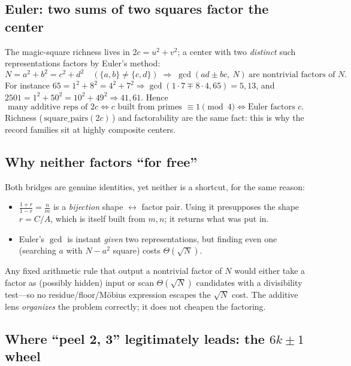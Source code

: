 \documentclass[11pt]{article}
\begin{document}
\subsection*{Euler: two sums of two squares factor the center}

The magic-square richness lives in $2c=u^2+v^2$; a center with two \emph{distinct}
such representations factors by Euler's method:
\[
N=a^2+b^2=c^2+d^2\quad(\{a,b\}\neq\{c,d\})
\;\Longrightarrow\;
\gcd(ad\pm bc,\ N)\ \text{are nontrivial factors of }N.
\]
For instance $65=1^2+8^2=4^2+7^2\Rightarrow\gcd(1\cdot7\mp8\cdot4,65)=5,13$, and
$2501=1^2+50^2=10^2+49^2\Rightarrow41,61$. Hence
\[
\text{many additive reps of }2c
\iff c\text{ built from primes }\equiv1\!\!\pmod4
\iff \text{Euler factors }c .
\]
Richness (\,$\mathrm{square\_pairs}(2c)$\,) and factorability are the same fact:
this is why the record families sit at highly composite centers.

\subsection*{Why neither factors ``for free''}

Both bridges are genuine identities, yet neither is a shortcut, for the same
reason:
\begin{itemize}[nosep]
\item $\tfrac{1+r}{1-r}=\tfrac nm$ is a \emph{bijection} shape $\leftrightarrow$
factor pair. Using it presupposes the shape $r=C/A$, which is itself built from
$m,n$; it returns what was put in.
\item Euler's $\gcd$ is instant \emph{given} two representations, but finding even
one (searching $a$ with $N-a^2$ square) costs $\Theta(\sqrt N)$.
\end{itemize}
Any fixed arithmetic rule that output a nontrivial factor of $N$ would either take
a factor as (possibly hidden) input or scan $\Theta(\sqrt N)$ candidates with a
divisibility test---so no residue/floor/Möbius expression escapes the
$\sqrt N$ cost. The additive lens \emph{organizes} the problem correctly; it does
not cheapen the factoring.

\subsection*{Where ``peel 2, 3'' legitimately leads: the $6k\pm1$ wheel}
\end{document}
